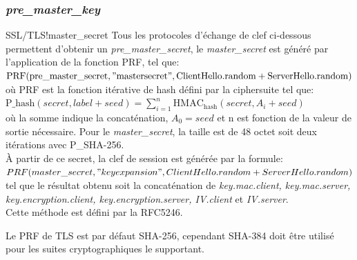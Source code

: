 \documentclass[twoside,a4paper,12pt,titlepage]{book}
\begin{document}
\subsubsection{\textit{pre\_master\_key}}
\begin{Define}{SSL/TLS!master\_secret}
Tous les protocoles d'échange de clef ci-dessous permettent d'obtenir un  \textit{pre\_master\_secret}, le \textit{master\_secret} est généré par l'application de la fonction PRF, tel que:\\ $\mathrm{PRF}(\mathrm{pre\_master\_secret}, \mathrm{"master secret"},\mathrm{ClientHello.random}+\mathrm{ServerHello.random})$\\ où PRF est la fonction itérative de hash défini par la ciphersuite tel que:\\ $\mathrm{P\_hash}(secret,label+seed)= \sum\limits_{i=1}^n \mathrm{HMAC_{hash}}(secret,A_i+seed)$\\où la somme indique la concaténation, $A_0=seed$ et n est fonction de la valeur de sortie nécessaire. Pour le \textit{master\_secret}, la taille est de 48 octet soit deux itérations avec P\_SHA-256.\\
\`A partir de ce secret, la clef de session est générée par la formule:\\%
$PRF(master\_secret, "key expansion",ClientHello.random + ServerHello.random)$\\
tel que le résultat obtenu soit la concaténation de \textit{key.mac.client, key.mac.server, key.encryption.client, key.encryption.server, IV.client} et \textit{IV.server}.\\
Cette méthode est défini par la RFC5246.
\end{Define}
Le PRF de TLS est par défaut SHA-256, cependant SHA-384 doit être utilisé pour les suites cryptographiques le supportant.
\end{document}
